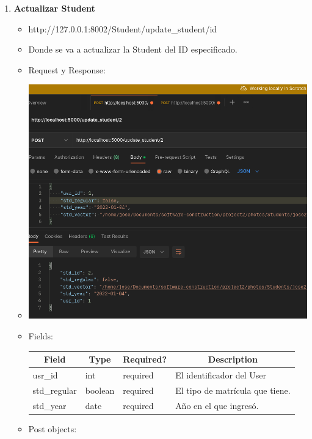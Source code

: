 \documentclass{article}
\begin{document}
\begin{enumerate}
    \item \textbf{Actualizar Student}
    \begin{itemize}
        \item http://127.0.0.1:8002/Student/update\_student/id
        \item Donde se va a actualizar la Student del ID especificado.
        \item Request y Response:
        \item \includegraphics[scale=.5]{assets/student/update.png}
        \item Fields: \begin{table}[H] \centering \begin{tabular}{|l|l|l|l|} \hline
        \multicolumn{1}{|c|}{\textbf{Field}} &
        \multicolumn{1}{c|}{\textbf{Type}} &
        \multicolumn{1}{c|}{\textbf{Required?}} &
        \multicolumn{1}{c|}{\textbf{Description}} \\ \hline usr\_id & int &
        required & El identificador del User \\ \hline std\_regular & boolean &
        required & El tipo de matrícula que tiene. \\ \hline std\_year & date &
        required & Año en el que ingresó. \\ \hline \end{tabular} \end{table}
        \item Post objects: \begin{table}[H] \centering \begin{tabular}{|l|l|l|} \hline

\end{tabular}
\end{table}
\end{itemize}
\end{enumerate}
\end{document}

